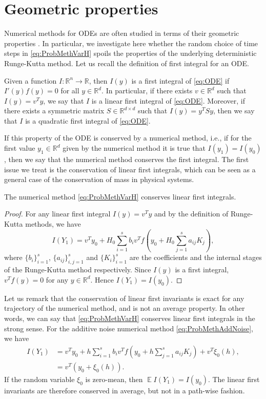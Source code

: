 \documentclass{siamart1116}
\numberwithin{theorem}{section}
\newcommand{\R}{\mathbb{R}}
\newcommand{\E}{\operatorname{\mathbb{E}}}
\newcommand{\sksum}{\textstyle\sum}
\begin{document}
\section{Geometric properties}\label{sec:GeomProperties}
Numerical methods for ODEs are often studied in terms of their geometric properties \cite{HLW06}. In particular, we investigate here whether the random choice of time steps in \eqref{eq:ProbMethVarH} spoils the properties of the underlying deterministic Runge-Kutta method. Let us recall the definition of first integral for an ODE.
\begin{definition} Given a function $I\colon\R^n\to\R$, then $I(y)$ is a first integral of \eqref{eq:ODE} if $I'(y)f(y) = 0$ for all $y \in \R^d$. In particular, if there exists $v \in \R^d$ such that $I(y) = v^Ty$, we say that $I$ is a linear first integral of \eqref{eq:ODE}. Moreover, if there exists a symmetric matrix $S \in \R^{d\times d}$ such that $I(y) = y^TSy$, then we say that $I$ is a quadratic first integral of \eqref{eq:ODE}.
\end{definition}
If this property of the ODE is conserved by a numerical method, i.e., if for the first value $y_1\in\R^d$  given by the numerical method it is true that $I(y_1) = I(y_0)$, then we say that the numerical method conserves the first integral. The first issue we treat is the conservation of linear first integrals, which can be seen as a general case of the conservation of mass in physical systems.
\begin{theorem}\label{thm:LinearInvariants} The numerical method \eqref{eq:ProbMethVarH} conserves linear first integrals.
\end{theorem}
\begin{proof} For any linear first integral $I(y) = v^T y$ and by the definition of Runge-Kutta methods, we have
	\begin{equation}
		I(Y_1) = v^T y_0 + H_0 \sksum_{i=1}^s b_iv^T f(y_0 + H_0\sksum_{j=1}^{s} a_{ij}K_j),
	\end{equation}
	where $\{b_i\}_{i=1}^s$, $\{a_{ij}\}_{i,j=1}^s$ and $\{K_i\}_{i=1}^s$ are the coefficients and the internal stages of the Runge-Kutta method respectively. Since $I(y)$ is a first integral, $v^T f(y) = 0$ for any $y \in \R^d$. Hence $I(Y_1)  = I(y_0)$.
\end{proof}
\begin{remark} Let us remark that the conservation of linear first invariants is exact for any trajectory of the numerical method, and is not an average property. In other words, we can say that \eqref{eq:ProbMethVarH} conserves linear first integrals in the strong sense. For the additive noise numerical method \eqref{eq:ProbMethAddNoise}, we have
	\begin{equation}
	\begin{aligned}
		I(Y_1) &= v^T y_0 + h \sksum_{i=1}^s b_iv^T f(y_0 + h\sksum_{j=1}^{s} a_{ij}K_j) + v^T \xi_0(h), \\
		&= v^T (y_0 + \xi_0(h)).
	\end{aligned}
	\end{equation}
	If the random variable $\xi_0$ is zero-mean, then $\E I(Y_1) = I(y_0)$. The linear first invariants are therefore conserved in average, but not in a path-wise fashion.
\end{remark}
\end{document}
